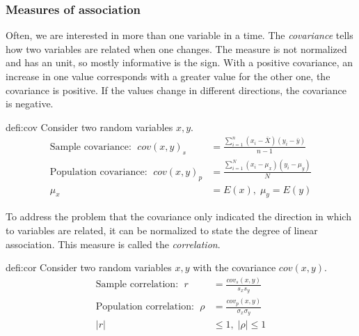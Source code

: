 	\subsubsection{Measures of association}
		Often, we are interested in more than one variable in a time. The \emph{covariance} tells how two variables are related when one changes. The measure is not normalized and has an unit, so mostly informative is the sign. With a positive covariance, an increase in one value corresponds with a greater value for the other one, the covariance is positive. If the values change in different directions, the covariance is negative.
		\begin{defi}[Covariance]{defi:cov}
			Consider two random variables $x, y$.
			\begin{align*}
			\text{Sample covariance: }\;cov(x,y)_s&=\frac{\sum\limits_{i=1}^n(x_i-\bar{X})(y_i-\bar{y})}{n-1}\\
			\text{Population covariance: }\;cov(x,y)_p&=\frac{\sum\limits_{i=1}^N(x_i-\mu_x)(y_i-\mu_y)}{N}\\
			\mu_x&=E(x),\;\mu_y=E(y)
			\end{align*}					
		\end{defi}
		To address the problem that the covariance only indicated the direction in which to variables are related, it can be normalized to state the degree of linear association. This measure is called the \emph{correlation}.
		\begin{defi}[Correlation]{defi:cor}
			Consider two random variables $x, y$ with the covariance $cov(x,y)$. 
			\begin{align*}
			\text{Sample correlation: }\;r&=\frac{cov_{s}(x,y)}{s_x s_y}\\
			\text{Population correlation: }\;\rho&=\frac{cov_{p}(x,y)}{\sigma_x \sigma_y}\\
			|r|&\leq 1,\;|\rho|\leq 1
			\end{align*}
		\end{defi}		
